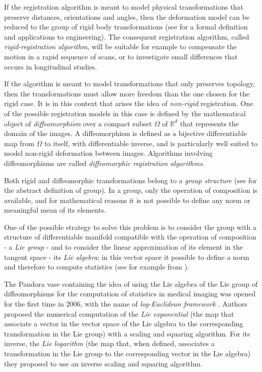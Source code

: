 If the registration algorithm is meant to model physical transformations that preserve distances, orientations and angles, then the deformation model can be reduced to the group of rigid body transformations (see \cite{gallier2011geometric} for a formal definition and applications to engineering). The consequent registration algorithm, called \emph{rigid-registration algorithm}, will be suitable for example to compensate the motion in a rapid sequence of scans, or to investigate small differences that occurs in longitudinal studies.

If the algorithm is meant to model transformations that only preserves topology, then the transformations must allow more freedom than the one chosen for the rigid case. It is in this context that arises the idea of \emph{non-rigid} registration. One of the possible registration models in this case is defined by the mathematical object of \emph{diffeomorphism} over a compact subset $\Omega$ of $\mathbb{R}^{d}$ that represents the domain of the images. A diffeomorphism is defined as a bijective differentiable map from $\Omega$ to itself, with differentiable inverse, and is particularly well suited to model non-rigid deformation between images. Algorithms involving diffeomorphisms are called \emph{diffeomorphic registration algorithms}.

Both rigid and diffeomorphic transformations belong to a \emph{group structure} (see \cite{artin2011algebra} for the abstract definition of group). In a group, only the operation of composition is available, and for mathematical reasons it is not possible to define any norm or meaningful mean of its elements. 

One of the possible strategy to solve this problem is to consider the group with a structure of differentiable manifold compatible with the operation of composition - a \emph{Lie group} - and to consider the linear approximation of its element in the tangent space - its \emph{Lie algebra}; in this vector space it possible to define a norm and therefore to compute statistics (see for example from \cite{lee2012introduction, arnold2006ordinary, warner, do1976differential, misner1973gravitation, holm2009geometric}).

The Pandora vase containing the idea of using the Lie algebra of the Lie group of diffeomorphisms for the computation of statistics in medical imaging was opened for the first time in $2006$, with the name of \emph{log-Euclidean framework} \cite{Arsigny:MRM:06}.
Authors proposed the numerical computation of the \emph{Lie exponential} (the map that associate a vector in the vector space of the Lie algebra to the corresponding transformation in the Lie group) with a scaling and squaring algorithm. For its inverse, the \emph{Lie logarithm} (the map that, when defined, associates a transformation in the Lie group to the corresponding vector in the Lie algebra) they proposed to use an inverse scaling and squaring algorithm.

